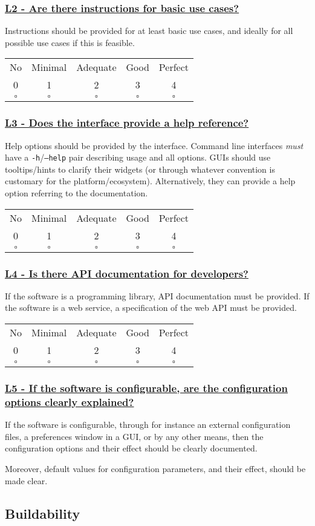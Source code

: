 \documentclass[a4paper,11pt]{article}
\newcommand{\criterion}[2]{\subsubsection*{\underline{#1 - #2}}\label{id:#1}}
\newcommand\CheckTable{%
  \begin{tabular}{ccccc}
    No & Minimal & Adequate & Good & Perfect \\
    0 & 1 & 2 & 3 & 4 \\
    \hline
    $\square$ & $\square$ & $\square$ & $\square$ & $\square$ \\
  \end{tabular}%
}
\begin{document}
\newcommand{\lTwoID}{L2}
\newcommand{\lTwoText}{Are there instructions for basic use cases?}
\criterion{\lTwoID}{\lTwoText}

Instructions should be provided for at least basic use cases, and ideally for
all possible use cases if this is feasible.

%
%
%

\CheckTable

\newcommand{\lThreeID}{L3}
\newcommand{\lThreeText}{Does the interface provide a help reference?}
\criterion{\lThreeID}{\lThreeText}

Help options should be provided by the interface. Command line interfaces
\emph{must} have a \texttt{-h}/\texttt{--help} pair describing usage and all options. GUIs should use tooltips/hints to clarify
their widgets (or through whatever convention is customary for the
platform/ecosystem). Alternatively, they can provide a help option referring to
the documentation.

\CheckTable

\newcommand{\lFourID}{L4}
\newcommand{\lFourText}{Is there API documentation for developers?}
\criterion{\lFourID}{\lFourText}

If the software is a programming library, API documentation must be provided.
If the software is a web service, a specification of the web API must be provided.

\CheckTable

\newcommand{\lFiveID}{L5}
\newcommand{\lFiveText}{If the software is configurable, are the configuration options clearly explained?}
\criterion{\lFiveID}{\lFiveText}

%
%

If the software is configurable, through for instance an external configuration
files, a preferences window in a GUI, or by any other means, then the
configuration options and their effect should be clearly documented.

Moreover, default values for configuration parameters, and their effect, should be
made clear.

\subsection{Buildability}\label{sec:bui}
\end{document}
